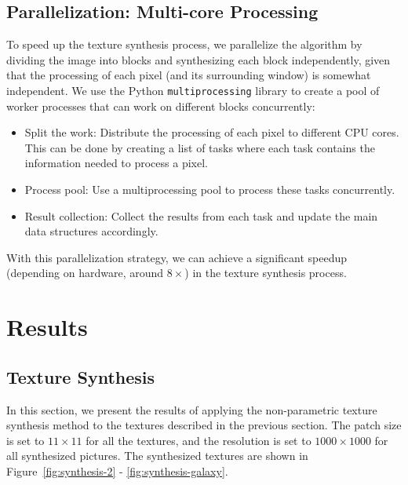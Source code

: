 \documentclass{article}
\begin{document}
\subsection{Parallelization: Multi-core Processing}

To speed up the texture synthesis process, we parallelize the algorithm by dividing the image into blocks and synthesizing each block independently, given that the processing of each pixel (and its surrounding window) is somewhat independent.
We use the Python \texttt{multiprocessing} library to create a pool of worker processes that can work on different blocks concurrently:
\begin{itemize}
    \item {Split the work:} Distribute the processing of each pixel to different CPU cores. This can be done by creating a list of tasks where each task contains the information needed to process a pixel.
    \item {Process pool:} Use a multiprocessing pool to process these tasks concurrently.
    \item {Result collection:} Collect the results from each task and update the main data structures accordingly.
\end{itemize}
With this parallelization strategy, we can achieve a significant speedup (depending on hardware, around $8\times$) in the texture synthesis process.

\section{Results}
\subsection{Texture Synthesis}
In this section, we present the results of applying the non-parametric texture synthesis method to the textures described in the previous section.
The patch size is set to $11 \times 11$ for all the textures, and the resolution is set to $1000\times 1000$ for all synthesized pictures.
The synthesized textures are shown in Figure~\ref{fig:synthesis-2} - \ref{fig:synthesis-galaxy}.
\end{document}
